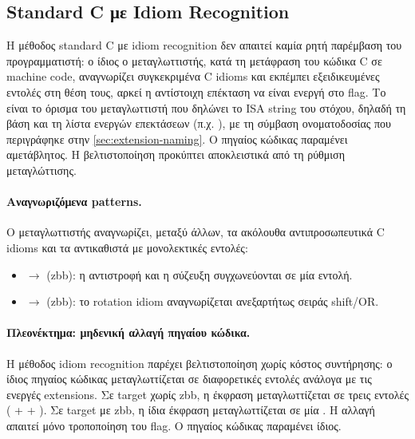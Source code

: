 \subsection{Standard C με Idiom Recognition}
\label{ssec:idiom-recognition}

Η μέθοδος standard C με idiom recognition δεν απαιτεί καμία ρητή παρέμβαση του
προγραμματιστή: ο ίδιος ο μεταγλωττιστής, κατά τη μετάφραση του κώδικα C σε machine
code, αναγνωρίζει συγκεκριμένα C idioms και εκπέμπει εξειδικευμένες εντολές
στη θέση τους, αρκεί η αντίστοιχη επέκταση να είναι ενεργή στο 
flag. Το  είναι το όρισμα του μεταγλωττιστή που δηλώνει το ISA
string του στόχου, δηλαδή τη βάση και τη λίστα ενεργών επεκτάσεων (π.χ.
), με τη σύμβαση ονοματοδοσίας που
περιγράφηκε στην \cref{sec:extension-naming}. Ο πηγαίος κώδικας παραμένει
αμετάβλητος. Η βελτιστοποίηση προκύπτει αποκλειστικά από τη ρύθμιση
μεταγλώττισης.

\paragraph{Αναγνωριζόμενα patterns.}
Ο μεταγλωττιστής αναγνωρίζει, μεταξύ άλλων, τα ακόλουθα αντιπροσωπευτικά C
idioms και τα αντικαθιστά με μονολεκτικές εντολές:
\begin{itemize}
  \item {} $\to$  (\gls{zbb}): η
    αντιστροφή και η σύζευξη συγχωνεύονται σε μία εντολή.
  \item {} $\to$ \rori (\gls{zbb}): το
    rotation idiom αναγνωρίζεται ανεξαρτήτως σειράς shift/OR.
\end{itemize}

\paragraph{Πλεονέκτημα: μηδενική αλλαγή πηγαίου κώδικα.}
Η μέθοδος idiom recognition παρέχει βελτιστοποίηση χωρίς κόστος συντήρησης:
ο ίδιος πηγαίος κώδικας μεταγλωττίζεται σε διαφορετικές εντολές ανάλογα
με τις ενεργές extensions. Σε target χωρίς \gls{zbb}, η έκφραση
 μεταγλωττίζεται σε τρεις εντολές
( +  + ). Σε target με \gls{zbb}, η ίδια
έκφραση μεταγλωττίζεται σε μία . Η αλλαγή
απαιτεί μόνο τροποποίηση του  flag. Ο πηγαίος κώδικας
παραμένει ίδιος.

